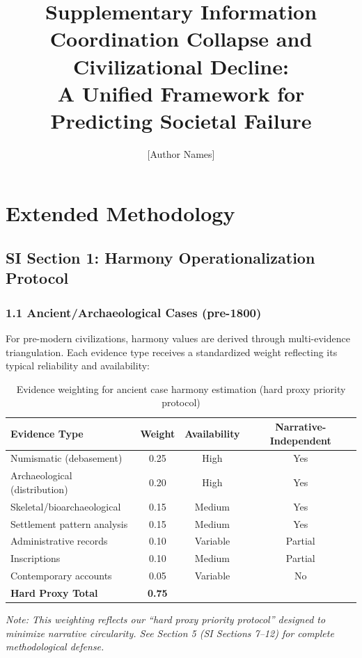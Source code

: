\documentclass[11pt,a4paper]{article}
\title{\textbf{Supplementary Information}\\[0.5em]
\large Coordination Collapse and Civilizational Decline:\\
A Unified Framework for Predicting Societal Failure}
\author{[Author Names]}
\date{}
\begin{document}
\maketitle

\tableofcontents
\newpage

\section{Extended Methodology}

\subsection{SI Section 1: Harmony Operationalization Protocol}

\subsubsection{1.1 Ancient/Archaeological Cases (pre-1800)}

For pre-modern civilizations, harmony values are derived through multi-evidence triangulation. Each evidence type receives a standardized weight reflecting its typical reliability and availability:

\begin{table}[H]
\centering
\caption{Evidence weighting for ancient case harmony estimation (hard proxy priority protocol)}
\begin{tabular}{lccc}
\toprule
\textbf{Evidence Type} & \textbf{Weight} & \textbf{Availability} & \textbf{Narrative-Independent} \\
\midrule
Numismatic (debasement) & 0.25 & High & Yes \\
Archaeological (distribution) & 0.20 & High & Yes \\
Skeletal/bioarchaeological & 0.15 & Medium & Yes \\
Settlement pattern analysis & 0.15 & Medium & Yes \\
Administrative records & 0.10 & Variable & Partial \\
Inscriptions & 0.10 & Medium & Partial \\
Contemporary accounts & 0.05 & Variable & No \\
\midrule
\textbf{Hard Proxy Total} & \textbf{0.75} & & \\
\bottomrule
\end{tabular}
\end{table}

\textit{Note: This weighting reflects our ``hard proxy priority protocol'' designed to minimize narrative circularity. See Section 5 (SI Sections 7--12) for complete methodological defense.}
\end{document}
